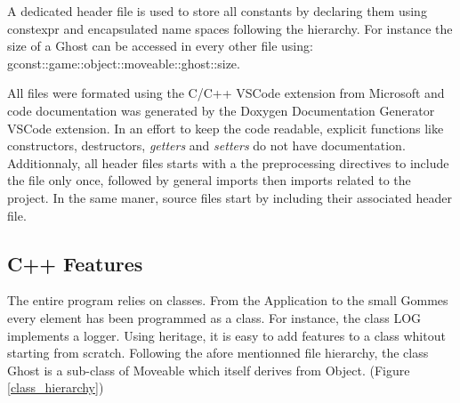 A dedicated header file is used to store all constants by declaring them using \textsf{constexpr} and encapsulated name spaces following the hierarchy. For instance the size of a \textsf{Ghost} can be accessed in every other file using: \textsf{gconst::game::object::moveable::ghost::size}.

All files were formated using the C/C++ VSCode extension from Microsoft and code documentation was generated by the Doxygen Documentation Generator VSCode extension.\cite{cpp_tools}\cite{gen_doc} In an effort to keep the code readable, explicit functions like constructors, destructors, \textit{getters} and \textit{setters} do not have documentation.
Additionnaly, all header files starts with a the preprocessing directives to include the file only once, followed by general imports then imports related to the project. In the same maner, source files start by including their associated header file.

\subsection{C++ Features}
The entire program relies on classes. From the \textsf{Application} to the small \textsf{Gommes} every element has been programmed as a class. For instance, the class \textsf{LOG} implements a logger. Using heritage, it is easy to add features to a class whitout starting from scratch. Following the afore mentionned file hierarchy, the class \textsf{Ghost} is a sub-class of \textsf{Moveable} which itself derives from \textsf{Object}. (Figure \ref{class_hierarchy})

